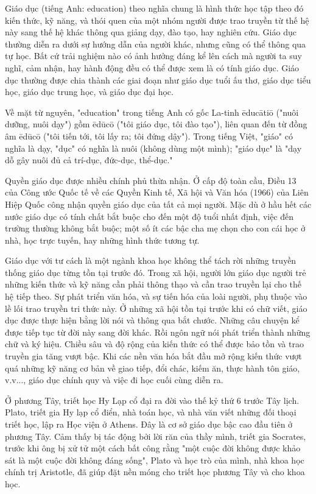 \documentclass[../thesis.tex]{subfiles}
\begin{document}
Giáo dục\cite{wiki:giaoduc} (tiếng Anh: education) theo nghĩa chung là hình thức học tập theo đó kiến thức, kỹ năng, và thói quen của một nhóm người được trao truyền từ thế hệ này sang thế hệ khác thông qua giảng dạy, đào tạo, hay nghiên cứu. Giáo dục thường diễn ra dưới sự hướng dẫn của người khác, nhưng cũng có thể thông qua tự học. Bất cứ trải nghiệm nào có ảnh hưởng đáng kể lên cách mà người ta suy nghĩ, cảm nhận, hay hành động đều có thể được xem là có tính giáo dục. Giáo dục thường được chia thành các giai đoạn như giáo dục tuổi ấu thơ, giáo dục tiểu học, giáo dục trung học, và giáo dục đại học.

Về mặt từ nguyên, "education" trong tiếng Anh có gốc La-tinh ēducātiō ("nuôi dưỡng, nuôi dạy") gồm ēdūcō ("tôi giáo dục, tôi đào tạo"), liên quan đến từ đồng âm ēdūcō ("tôi tiến tới, tôi lấy ra; tôi đứng dậy"). Trong tiếng Việt, "giáo" có nghĩa là dạy, "dục" có nghĩa là nuôi (không dùng một mình); "giáo dục" là "dạy dỗ gây nuôi đủ cả trí-dục, đức-dục, thể-dục."

Quyền giáo dục được nhiều chính phủ thừa nhận. Ở cấp độ toàn cầu, Điều 13 của Công ước Quốc tế về các Quyền Kinh tế, Xã hội và Văn hóa (1966) của Liên Hiệp Quốc công nhận quyền giáo dục của tất cả mọi người. Mặc dù ở hầu hết các nước giáo dục có tính chất bắt buộc cho đến một độ tuổi nhất định, việc đến trường thường không bắt buộc; một số ít các bậc cha mẹ chọn cho con cái học ở nhà, học trực tuyến, hay những hình thức tương tự.

Giáo dục với tư cách là một ngành khoa học không thể tách rời những truyền thống giáo dục từng tồn tại trước đó. Trong xã hội, người lớn giáo dục người trẻ những kiến thức và kỹ năng cần phải thông thạo và cần trao truyền lại cho thế hệ tiếp theo. Sự phát triển văn hóa, và sự tiến hóa của loài người, phụ thuộc vào lề lối trao truyền tri thức này. Ở những xã hội tồn tại trước khi có chữ viết, giáo dục được thực hiện bằng lời nói và thông qua bắt chước. Những câu chuyện kể được tiếp tục từ đời này sang đời khác. Rồi ngôn ngữ nói phát triển thành những chữ và ký hiệu. Chiều sâu và độ rộng của kiến thức có thể được bảo tồn và trao truyền gia tăng vượt bậc. Khi các nền văn hóa bắt đầu mở rộng kiến thức vượt quá những kỹ năng cơ bản về giao tiếp, đổi chác, kiếm ăn, thực hành tôn giáo, v.v..., giáo dục chính quy và việc đi học cuối cùng diễn ra.

Ở phương Tây, triết học Hy Lạp cổ đại ra đời vào thế kỷ thứ 6 trước Tây lịch. Plato, triết gia Hy lạp cổ điển, nhà toán học, và nhà văn viết những đối thoại triết học, lập ra Học viện ở Athens. Đây là cơ sở giáo dục bậc cao đầu tiên ở phương Tây. Cảm thấy bị tác động bởi lời răn của thầy mình, triết gia Socrates, trước khi ông bị xử tử một cách bất công rằng "một cuộc đời không được khảo sát là một cuộc đời không đáng sống", Plato và học trò của mình, nhà khoa học chính trị Aristotle, đã giúp đặt nền móng cho triết học phương Tây và cho khoa học.
\end{document}
